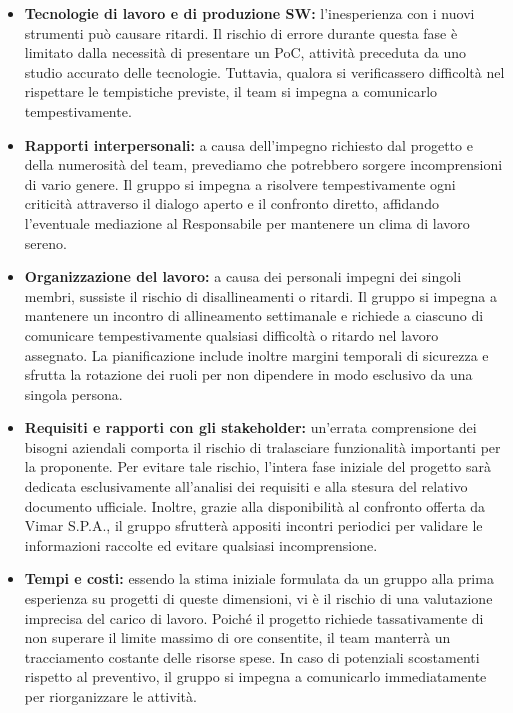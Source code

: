 \documentclass[11pt, a4paper]{article}
\begin{document}
\begin{itemize}
   \item \textbf{Tecnologie di lavoro e di produzione SW:} l'inesperienza con i nuovi strumenti può causare ritardi. Il rischio di errore durante questa fase è limitato dalla necessità di presentare un PoC, attività preceduta da uno studio accurato delle tecnologie. Tuttavia, qualora si verificassero difficoltà nel rispettare le tempistiche previste, il team si impegna a comunicarlo tempestivamente.
    
    \item \textbf{Rapporti interpersonali:} a causa dell'impegno richiesto dal progetto e della numerosità del team, prevediamo che potrebbero sorgere incomprensioni di vario genere. Il gruppo si impegna a risolvere tempestivamente ogni criticità attraverso il dialogo aperto e il confronto diretto, affidando l'eventuale mediazione al Responsabile per mantenere un clima di lavoro sereno.
    
    \item \textbf{Organizzazione del lavoro:} a causa dei personali impegni dei singoli membri, sussiste il rischio di disallineamenti o ritardi. Il gruppo si impegna a mantenere un incontro di allineamento settimanale e richiede a ciascuno di comunicare tempestivamente qualsiasi difficoltà o ritardo nel lavoro assegnato. La pianificazione include inoltre margini temporali di sicurezza e sfrutta la rotazione dei ruoli per non dipendere in modo esclusivo da una singola persona.
    
    \item \textbf{Requisiti e rapporti con gli stakeholder:} un'errata comprensione dei bisogni aziendali comporta il rischio di tralasciare funzionalità importanti per la proponente. Per evitare tale rischio, l'intera fase iniziale del progetto sarà dedicata esclusivamente all'analisi dei requisiti e alla stesura del relativo documento ufficiale. Inoltre, grazie alla disponibilità al confronto offerta da Vimar S.P.A., il gruppo sfrutterà appositi incontri periodici per validare le informazioni raccolte ed evitare qualsiasi incomprensione.
    
    \item \textbf{Tempi e costi:} essendo la stima iniziale formulata da un gruppo alla prima esperienza su progetti di queste dimensioni, vi è il rischio di una valutazione imprecisa del carico di lavoro. Poiché il progetto richiede tassativamente di non superare il limite massimo di ore consentite, il team manterrà un tracciamento costante delle risorse spese. In caso di potenziali scostamenti rispetto al preventivo, il gruppo si impegna a comunicarlo immediatamente per riorganizzare le attività.
    
\end{itemize}
\end{document}
